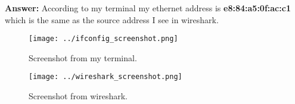 \documentclass[12pt,letterpaper]{article}
\begin{document}
\begin{enumerate}
\begin{enumerate}
         {\bf Answer:} According to my terminal my ethernet address is {\bf e8:84:a5:0f:ac:c1} which is the same as the source address I see in wireshark.

        \begin{figure}
             \centering
             \texttt{[image: ../ifconfig\_screenshot.png]}
             \caption{Screenshot from my terminal.}
             \label{fig:1}
        \end{figure}

        \begin{figure}
             \centering
             \texttt{[image: ../wireshark\_screenshot.png]}
             \caption{Screenshot from wireshark.}
             \label{fig:1}
        \end{figure}

    \end{enumerate}
\end{enumerate}

\end{document}
